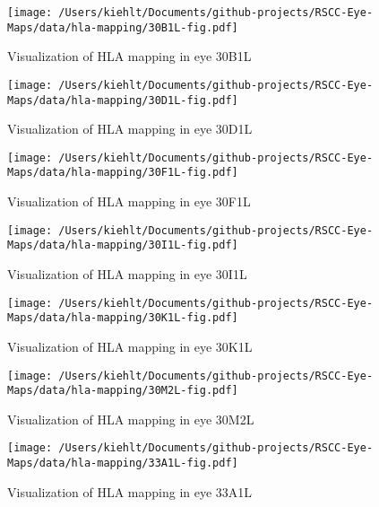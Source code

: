 \documentclass{article}
\begin{document}
\begin{center}
\begin{figure}
\texttt{[image: /Users/kiehlt/Documents/github-projects/RSCC-Eye-Maps/data/hla-mapping/30B1L-fig.pdf]}
\caption{Visualization of HLA mapping in eye 30B1L}
\label{fig:30B1L}
\end{figure}

\end{center}
\begin{center}
\begin{figure}
\texttt{[image: /Users/kiehlt/Documents/github-projects/RSCC-Eye-Maps/data/hla-mapping/30D1L-fig.pdf]}
\caption{Visualization of HLA mapping in eye 30D1L}
\label{fig:30D1L}
\end{figure}

\end{center}
\begin{center}
\begin{figure}
\texttt{[image: /Users/kiehlt/Documents/github-projects/RSCC-Eye-Maps/data/hla-mapping/30F1L-fig.pdf]}
\caption{Visualization of HLA mapping in eye 30F1L}
\label{fig:30F1L}
\end{figure}

\end{center}
\begin{center}
\begin{figure}
\texttt{[image: /Users/kiehlt/Documents/github-projects/RSCC-Eye-Maps/data/hla-mapping/30I1L-fig.pdf]}
\caption{Visualization of HLA mapping in eye 30I1L}
\label{fig:30I1L}
\end{figure}

\end{center}
\begin{center}
\begin{figure}
\texttt{[image: /Users/kiehlt/Documents/github-projects/RSCC-Eye-Maps/data/hla-mapping/30K1L-fig.pdf]}
\caption{Visualization of HLA mapping in eye 30K1L}
\label{fig:30K1L}
\end{figure}

\end{center}
\begin{center}
\begin{figure}
\texttt{[image: /Users/kiehlt/Documents/github-projects/RSCC-Eye-Maps/data/hla-mapping/30M2L-fig.pdf]}
\caption{Visualization of HLA mapping in eye 30M2L}
\label{fig:30M2L}
\end{figure}

\end{center}
\begin{center}
\begin{figure}
\texttt{[image: /Users/kiehlt/Documents/github-projects/RSCC-Eye-Maps/data/hla-mapping/33A1L-fig.pdf]}
\caption{Visualization of HLA mapping in eye 33A1L}
\label{fig:33A1L}
\end{figure}

\end{center}
\end{document}

